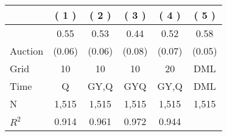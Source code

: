 
\begin{tabular}{lccccc}
\toprule
 & ( 1 ) & ( 2 ) & ( 3 ) & ( 4 ) & ( 5 )\\
\midrule
 & 0.55 & 0.53 & 0.44 & 0.52 & 0.58\\

\multirow{-2}{*}{\raggedright\arraybackslash Auction} & (0.06) & (0.06) & (0.08) & (0.07) & (0.05)\\

\midrule
Grid & 10 & 10 & 10 & 20 & DML\\

Time & Q & GY,Q & GYQ & GY,Q & DML\\

N & 1,515 & 1,515 & 1,515 & 1,515 & 1,515\\

$R^2$ & 0.914 & 0.961 & 0.972 & 0.944 & \\
\bottomrule
\end{tabular}
